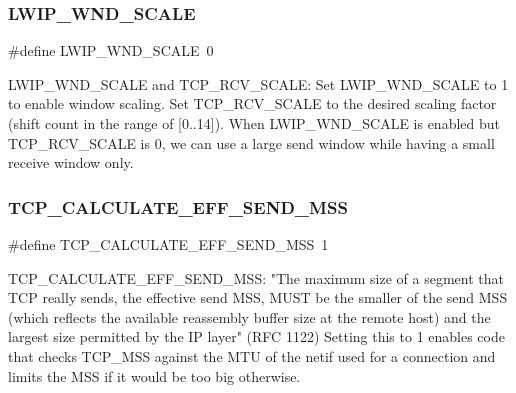 \subsubsection{\texorpdfstring{L\+W\+I\+P\+\_\+\+W\+N\+D\+\_\+\+S\+C\+A\+LE}{LWIP\_WND\_SCALE}\hspace{0.1cm}{\footnotesize\ttfamily [2/2]}}
{\footnotesize\ttfamily \#define L\+W\+I\+P\+\_\+\+W\+N\+D\+\_\+\+S\+C\+A\+LE~0}

L\+W\+I\+P\+\_\+\+W\+N\+D\+\_\+\+S\+C\+A\+LE and T\+C\+P\+\_\+\+R\+C\+V\+\_\+\+S\+C\+A\+LE\+: Set L\+W\+I\+P\+\_\+\+W\+N\+D\+\_\+\+S\+C\+A\+LE to 1 to enable window scaling. Set T\+C\+P\+\_\+\+R\+C\+V\+\_\+\+S\+C\+A\+LE to the desired scaling factor (shift count in the range of \mbox{[}0..14\mbox{]}). When L\+W\+I\+P\+\_\+\+W\+N\+D\+\_\+\+S\+C\+A\+LE is enabled but T\+C\+P\+\_\+\+R\+C\+V\+\_\+\+S\+C\+A\+LE is 0, we can use a large send window while having a small receive window only. \mbox{\label{group__lwip__opts__tcp_gac04b84d32251ac558f0c3a8af85ba3a5}} 
\subsubsection{\texorpdfstring{T\+C\+P\+\_\+\+C\+A\+L\+C\+U\+L\+A\+T\+E\+\_\+\+E\+F\+F\+\_\+\+S\+E\+N\+D\+\_\+\+M\+SS}{TCP\_CALCULATE\_EFF\_SEND\_MSS}\hspace{0.1cm}{\footnotesize\ttfamily [1/2]}}
{\footnotesize\ttfamily \#define T\+C\+P\+\_\+\+C\+A\+L\+C\+U\+L\+A\+T\+E\+\_\+\+E\+F\+F\+\_\+\+S\+E\+N\+D\+\_\+\+M\+SS~1}

T\+C\+P\+\_\+\+C\+A\+L\+C\+U\+L\+A\+T\+E\+\_\+\+E\+F\+F\+\_\+\+S\+E\+N\+D\+\_\+\+M\+SS\+: "The maximum size of a segment that T\+CP really sends, the \textquotesingle{}effective send M\+SS,\textquotesingle{} M\+U\+ST be the smaller of the send M\+SS (which reflects the available reassembly buffer size at the remote host) and the largest size permitted by the IP layer" (R\+FC 1122) Setting this to 1 enables code that checks T\+C\+P\+\_\+\+M\+SS against the M\+TU of the netif used for a connection and limits the M\+SS if it would be too big otherwise. \mbox{\label{group__lwip__opts__tcp_gac04b84d32251ac558f0c3a8af85ba3a5}} 
